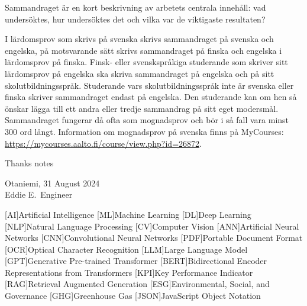 \documentclass[english, 12pt, a4paper, elec, utf8, a-2b, online]{aaltothesis}
\begin{document}
\begin{abstractpage}[swedish]
Sammandraget är en kort beskrivning av arbetets centrala innehåll: vad
undersöktes, hur undersöktes det och vilka var de viktigaste resultaten?

I lärdomsprov som skrivs på svenska skrivs sammandraget på svenska och engelska,
på motsvarande sätt skrivs sammandraget på finska och engelska i lärdomsprov på
finska. Finsk- eller svenskspråkiga studerande som skriver sitt lärdomsprov på
engelska ska skriva sammandraget på engelska och på sitt skolutbildningsspråk.
Studerande vars skolutbildningsspråk inte är svenska eller finska skriver
sammandraget endast på engelska. Den studerande kan om hen så önskar lägga till
ett andra eller tredje sammandrag på sitt eget modersmål. Sammandraget fungerar
då ofta som mognadsprov och bör i så fall vara minst 300 ord långt. Information
om mognadsprov på svenska finns på MyCourses:\\
\url{https://mycourses.aalto.fi/course/view.php?id=26872}.
\end{abstractpage}


\dothesispagenumbering{}


Thanks notes

\vspace{5cm}
Otaniemi, 31 August 2024\\

\vspace{5mm}
{\hfill Eddie E.\ Engineer \hspace{1cm}}

\newpage


\thesistableofcontents

\cleardoublepage

\newpage

[AI]{Artificial Intelligence}
[ML]{Machine Learning}
[DL]{Deep Learning}
[NLP]{Natural Language Processing}
[CV]{Computer Vision}
[ANN]{Artificial Neural Networks}
[CNN]{Convolutional Neural Networks}
[PDF]{Portable Document Format}
[OCR]{Optical Character Recognition}
[LLM]{Large Language Model}
[GPT]{Generative Pre-trained Transformer}
[BERT]{Bidirectional Encoder Representations from Transformers}
[KPI]{Key Performance Indicator}
[RAG]{Retrieval Augmented Generation}
[ESG]{Environmental, Social, and Governance}
[GHG]{Greenhouse Gas}
[JSON]{JavaScript Object Notation}
\end{document}
